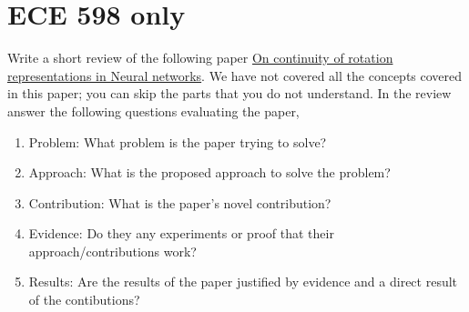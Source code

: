 \documentclass[twocolumn]{article}
\begin{document}
\section{ECE 598 only}

Write a short review of the following paper
\href{https://openaccess.thecvf.com/content_CVPR_2019/html/Zhou_On_the_Continuity_of_Rotation_Representations_in_Neural_Networks_CVPR_2019_paper.html}{On
  continuity of rotation representations in Neural networks}. We have not
covered all the concepts covered in this paper; you can skip the parts that you
do not understand. In the review answer the following questions evaluating the paper,
\begin{enumerate}
\item Problem: What problem is the paper trying to solve?
\item Approach: What is the proposed approach to solve the problem?
\item Contribution: What is the paper's novel contribution?
\item Evidence: Do they any experiments or proof that their approach/contributions work?
\item Results: Are the results of the paper justified by evidence and a direct
  result of the contibutions?
\end{enumerate}

%
%
\end{document}
